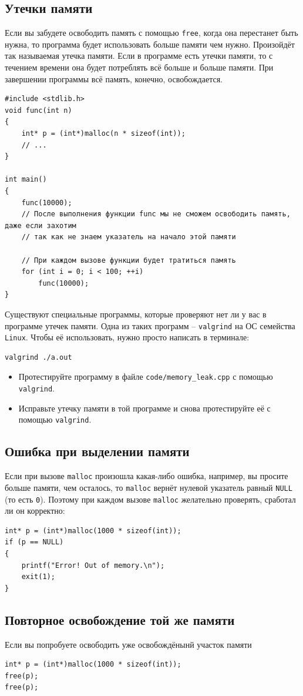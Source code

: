 \documentclass{article}
\begin{document}
\subsection*{Утечки памяти}
Если вы забудете освободить память с помощью \texttt{free}, когда она перестанет быть нужна, то программа будет использовать больше памяти чем нужно. Произойдёт так называемая утечка памяти. Если в программе есть утечки памяти, то с течением времени она будет потреблять всё больше и больше памяти. При завершении программы всё память, конечно, освобождается.
\begin{lstlisting}
#include <stdlib.h>
void func(int n) 
{
    int* p = (int*)malloc(n * sizeof(int));
    // ...
}

int main() 
{
    func(10000);
    // После выполнения функции func мы не сможем освободить память, даже если захотим
    // так как не знаем указатель на начало этой памяти
    
    // При каждом вызове функции будет тратиться память
    for (int i = 0; i < 100; ++i)
        func(10000);
}
\end{lstlisting}
Существуют специальные программы, которые проверяют нет ли у вас в программе утечек памяти. Одна из таких программ -- \texttt{valgrind} на ОС семейства \texttt{Linux}. Чтобы её использовать, нужно просто написать в терминале:
\begin{verbatim}
valgrind ./a.out
\end{verbatim}

\begin{itemize}
\item Протестируйте программу в файле \texttt{code/memory\_leak.cpp} с помощью \texttt{valgrind}.
\item Исправьте утечку памяти в той программе и снова протестируйте её с помощью \texttt{valgrind}.
\end{itemize}

\subsection*{Ошибка при выделении памяти}
Если при вызове \texttt{malloc} произошла какая-либо ошибка, например, вы просите больше памяти, чем осталось, то \texttt{malloc} вернёт нулевой указатель равный \texttt{NULL} (то есть \texttt{0}). Поэтому при каждом вызове \texttt{malloc} желательно проверять, сработал ли он корректно:
\begin{lstlisting}
int* p = (int*)malloc(1000 * sizeof(int));
if (p == NULL) 
{
    printf("Error! Out of memory.\n");
    exit(1);
}
\end{lstlisting}

\subsection*{Повторное освобождение той же памяти}
Если вы попробуете освободить уже освобождёнынй участок памяти
\begin{lstlisting}
int* p = (int*)malloc(1000 * sizeof(int));
free(p);
free(p);
\end{lstlisting}
\end{document}
